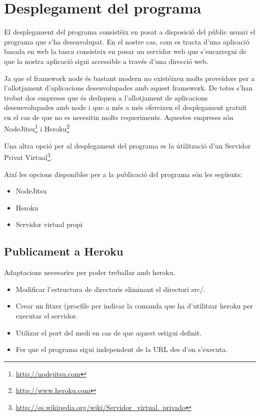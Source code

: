 \chapter{Desplegament del programa}

El desplegament del programa consistèix en posat a disposició del públic usuari el programa que s'ha desenvolupat. En el nostre cas, com es tracta d'una aplicació basada en web la tasca consisteix en posar un servidor web que s'encarregui de que la nostra aplicació sigui accessible a través d'una direcció web. 

Ja que el framework node és bastant modern no existéixen molts proveïdors per a l'allotjament d'aplicacions desenvolupades amb aquest framework. De totes s'han trobat dos empreses que és dediquen a l'allotjament de aplicacions desenevolupades amb node i que a més a més ofereixen el desplegament gratuït en el cas de que no es necesitin molts requeriments. Aquestes empreses són NodeJitsu\footnote{\url{http://nodejitsu.com}} i Heroku\footnote{\url{http://www.heroku.com}}

Una altra opció per al desplegament del programa es la útilització d'un Servidor Privat Virtual\footnote{\url{http://es.wikipedia.org/wiki/Servidor_virtual_privado}}. 

Així les opcions disponibles per a la publicació del programa són les següents: 

\begin{itemize}
\item{NodeJitsu}
\item{Heroku}
\item{Servidor virtual propi}
\end{itemize}


\section{Publicament a Heroku}

Adaptacions necesaries per poder treballar amb heroku. 

\begin{itemize}
\item{Modificar l'estructura de directoris eliminant el directori src/.}
\item{Crear un fitxer (procfile per indicar la comanda que ha d'utilitzar heroku per executar el servidor.}
\item{Utilizar el port del medi en cas de que aquest estigui definit. }
\item{Fer que el programa sigui independent de la URL des d'on s'executa.}
\end{itemize}

